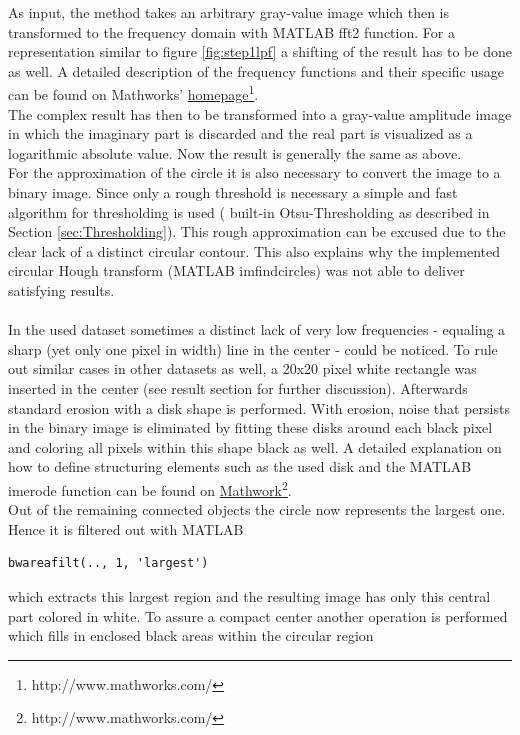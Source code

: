 \documentclass{article}
\begin{document}
As input, the method takes an arbitrary gray-value image which then is transformed to the frequency domain with MATLAB fft2 function. For a representation similar to figure \ref{fig:step1lpf} a shifting of the result has to be done as well. 
A detailed description of the frequency functions and their specific usage can be found on Mathworks'  \href{http://www.mathworks.com/}{homepage}\footnote{http://www.mathworks.com/}. \\
The complex result has then to be transformed into a gray-value amplitude image in which the imaginary part is discarded and the real part is visualized as a logarithmic absolute value. Now the result is generally the same as above. \\
For the approximation of the circle it is also necessary to convert the image to a binary image. Since only a rough threshold is necessary a simple and fast algorithm for thresholding is used (%
built-in Otsu-Thresholding as described in Section \ref{sec:Thresholding}). This rough approximation can be excused due to the clear lack of a distinct circular contour. %
This also explains why the implemented circular Hough transform (MATLAB imfindcircles) was not able to deliver satisfying results.\\
\\
In the used dataset sometimes a distinct lack of very low frequencies - equaling a sharp (yet only one pixel in width) line in the center - could be noticed. To rule out similar cases in other datasets as well, a 20x20 pixel white rectangle was inserted in the center (see result section for further discussion).
Afterwards standard erosion with a disk shape is performed. With erosion, noise that persists in the binary image is eliminated by fitting these disks around each black pixel and coloring all pixels within this shape black as well. A detailed explanation on how to define structuring elements such as the used disk and the MATLAB imerode function can be found on \href{http://www.mathworks.com/}{Mathwork}\footnote{http://www.mathworks.com/}. \\
Out of the remaining connected objects the circle now represents the largest one. Hence it is filtered out with MATLAB \begin{verbatim}bwareafilt(.., 1, 'largest') \end{verbatim}
which extracts this largest region and the resulting image has only this central part colored in white. To assure a compact center another operation is performed which fills in enclosed black areas within the circular region 
\end{document}
